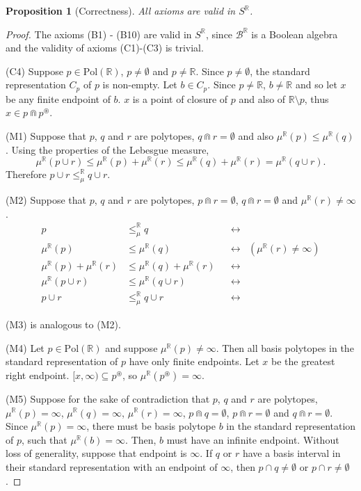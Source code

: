 \documentclass{article}
\newtheorem*{proposition}{Proposition}
\newcommand{\R}{\mathbb{R}}
\newcommand{\B}{\mathcal{B}}
\newcommand{\bcap}{\Cap}
\newcommand{\bstar}{^\circledast}
\newcommand{\bmeasure}{\leq_\mu^\R}
\newcommand{\Pol}{\text{Pol}}
\begin{document}
\begin{proposition}[Correctness]
  All axioms are valid in $S^\R$.
\end{proposition}
\begin{proof}
  The axioms (B1) - (B10) are valid in $S^\R$, since $\B^\R$ is a Boolean algebra and the validity of axioms (C1)-(C3) is trivial.

  (C4) Suppose $p \in \Pol(\R)$, $p \neq \emptyset$ and $p \neq \R$. Since $p \neq \emptyset$, the standard representation $C_p$ of $p$ is non-empty. Let $b \in C_p$. Since $p \neq \R$, $b \neq \R$ and so let $x$ be any finite endpoint of $b$. $x$ is a point of closure of $p$ and also of $\R \setminus p$, thus $x \in p \bcap p \bstar$.

  (M1) Suppose that $p$, $q$ and $r$ are polytopes, $q \bcap r = \emptyset$ and also $\mu^\R(p) \leq \mu^\R(q)$. Using the properties of the Lebesgue measure, \[\mu^\R(p \cup r) \leq \mu^\R(p) + \mu^\R(r) \leq \mu^\R(q) + \mu^\R(r) = \mu^\R(q \cup r).\]
  Therefore $p \cup r \bmeasure q \cup r$.

  (M2) Suppose that $p$, $q$ and $r$ are polytopes, $p \bcap r = \emptyset$, $q \bcap r = \emptyset$ and $\mu^\R(r) \neq \infty$.
  \begin{align*}
    p &\bmeasure q &&\leftrightarrow \\
    \mu^\R(p) &\leq \mu^\R(q) &&\leftrightarrow & (\mu^\R(r) \neq \infty)\\
    \mu^\R(p) + \mu^\R(r) &\leq \mu^\R(q) + \mu^\R(r) &&\leftrightarrow \\
    \mu^\R(p \cup r) &\leq \mu^\R(q \cup r) &&\leftrightarrow \\
    p \cup r &\bmeasure q \cup r &&\leftrightarrow
  \end{align*}

  (M3) is analogous to (M2).

  (M4) Let $p \in \Pol(\R)$ and suppose $\mu^\R(p) \neq \infty$. Then all basis polytopes in the standard representation of $p$ have only finite endpoints. Let $x$ be the greatest right endpoint. $[x, \infty) \subseteq p\bstar$, so $\mu^\R(p\bstar) = \infty$.

    (M5) Suppose for the sake of contradiction that $p$, $q$ and $r$ are polytopes, $\mu^\R(p) = \infty$, $\mu^\R(q) = \infty$, $\mu^\R(r) = \infty$, $p \bcap q = \emptyset$, $p \bcap r = \emptyset$ and $q \bcap r = \emptyset$.
    Since $\mu^\R(p) = \infty$, there must be basis polytope $b$ in the standard representation of $p$, such that $\mu^\R(b) = \infty$. Then, $b$ must have an infinite endpoint. Without loss of generality, suppose that endpoint is $\infty$. If $q$ or $r$ have a basis interval in their standard representation with an endpoint of $\infty$, then $p \cap q \neq \emptyset$ or $p \cap r \neq \emptyset$.


\end{proof}
\end{document}
